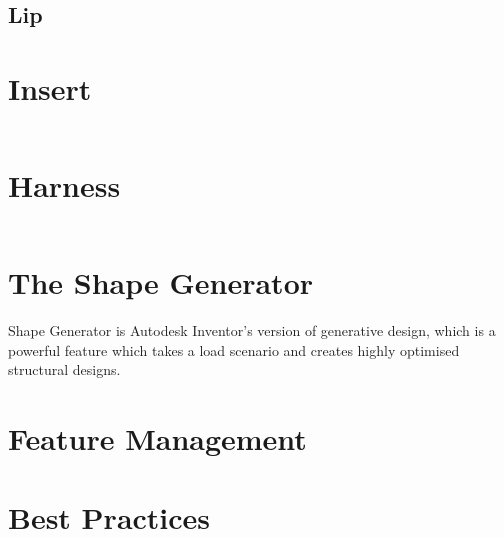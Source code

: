 \subsection{Lip}

\section{Insert}

$ $

\section{Harness}

$ $

\section{The Shape Generator}
Shape Generator is Autodesk Inventor's version of generative design, which is a powerful feature which takes a load scenario and creates highly optimised structural designs.

\section{Feature Management}

\section{Best Practices}